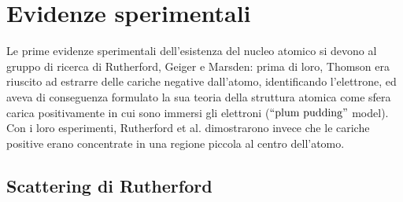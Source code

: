 \section{Evidenze sperimentali}

Le prime evidenze sperimentali dell'esistenza del nucleo atomico si devono al gruppo di ricerca di Rutherford, Geiger e Marsden: prima di loro, Thomson era riuscito ad estrarre delle cariche negative dall'atomo, identificando l'elettrone, ed aveva di conseguenza formulato la sua teoria della struttura atomica come sfera carica positivamente in cui sono immersi gli elettroni ($ ``\text{plum pudding}" $ model).\\
Con i loro esperimenti, Rutherford et al. dimostrarono invece che le cariche positive erano concentrate in una regione piccola al centro dell'atomo.

\subsection{Scattering di Rutherford}

